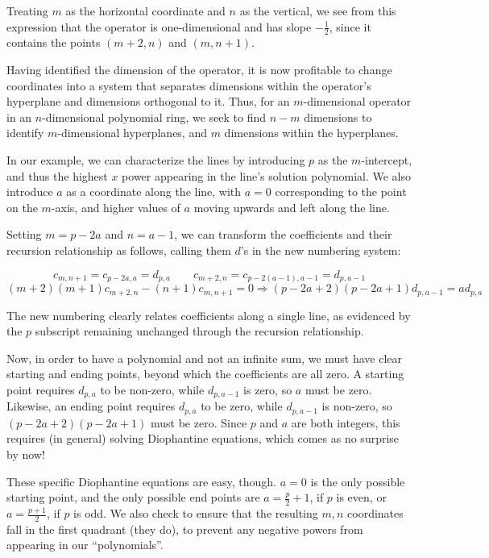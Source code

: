 \documentclass{article}
\begin{document}
Treating $m$ as the horizontal coordinate and $n$ as the vertical, we
see from this expression that the operator is one-dimensional and has
slope $-\frac{1}{2}$, since it contains the points $(m+2,n)$ and
$(m,n+1)$.

Having identified the dimension of the operator, it is now profitable
to change coordinates into a system that separates dimensions within
the operator's hyperplane and dimensions orthogonal to it.  Thus, for
an $m$-dimensional operator in an $n$-dimensional polynomial ring, we
seek to find $n-m$ dimensions to identify $m$-dimensional hyperplanes,
and $m$ dimensions within the hyperplanes.

In our example, we can characterize the lines by introducing
$p$ as the $m$-intercept, and thus the highest $x$ power appearing in
the line's solution polynomial.  We also introduce $a$ as a coordinate
along the line, with $a=0$ corresponding to the point on the $m$-axis,
and higher values of $a$ moving upwards and left along the line.

Setting $m=p-2a$ and $n=a-1$, we can transform the coefficients and
their recursion relationship as follows, calling them $d$'s in the new
numbering system:

$$c_{m,n+1} = c_{p-2a,a} = d_{p,a}  \qquad c_{m+2,n} = c_{p-2(a-1),a-1} = d_{p,a-1}$$
$$(m+2)(m+1)c_{m+2,n} - (n+1)c_{m,n+1} = 0 \Longrightarrow (p-2a+2)(p-2a+1) d_{p,a-1} = a d_{p,a}$$

The new numbering clearly relates coefficients along a single line, as
evidenced by the $p$ subscript remaining unchanged through the
recursion relationship.

Now, in order to have a polynomial and not an infinite sum, we must
have clear starting and ending points, beyond which the coefficients
are all zero.  A starting point requires $d_{p,a}$ to be non-zero,
while $d_{p,a-1}$ is zero, so $a$ must be zero.  Likewise, an ending
point requires $d_{p,a}$ to be zero, while $d_{p,a-1}$ is non-zero,
so $(p-2a+2)(p-2a+1)$ must be zero.  Since $p$ and $a$ are both
integers, this requires (in general) solving Diophantine equations,
which comes as no surprise by now!

These specific Diophantine equations are easy, though.  $a=0$ is the
only possible starting point, and the only possible end points are
$a=\frac{p}{2}+1$, if $p$ is even, or $a=\frac{p+1}{2}$, if $p$ is
odd.  We also check to ensure that the resulting $m,n$ coordinates
fall in the first quadrant (they do), to prevent any negative powers
from appearing in our ``polynomials''.
\end{document}
